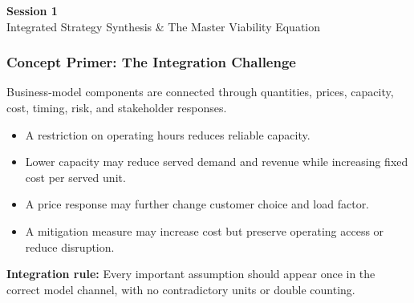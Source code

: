 \documentclass{beamer}
\begin{document}
\begin{frame}[c]
  \begin{center}
    \huge\color{cuhkpurple}\textbf{Session 1}\\
    \vspace{0.5cm}
    \Large Integrated Strategy Synthesis \& The Master Viability Equation
  \end{center}
\end{frame}

\begin{frame}[t]
\frametitle{Concept Primer: The Integration Challenge}
Business-model components are connected through quantities, prices, capacity, cost, timing, risk, and stakeholder responses.
\begin{itemize}
\item A restriction on operating hours reduces reliable capacity.
\item Lower capacity may reduce served demand and revenue while increasing fixed cost per served unit.
\item A price response may further change customer choice and load factor.
\item A mitigation measure may increase cost but preserve operating access or reduce disruption.
\end{itemize}
\textbf{Integration rule:} Every important assumption should appear once in the correct model channel, with no contradictory units or double counting.
\end{frame}
\end{document}
